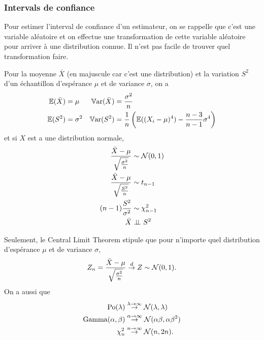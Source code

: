 \subsubsection{Intervals de confiance}
Pour estimer l'interval de confiance d'un estimateur,
on se rappelle que c'est une variable aléatoire et on
effectue une transformation de cette variable aléatoire
pour arriver à une distribution connue.
Il n'est pas facile de trouver quel transformation faire.

Pour la moyenne $\bar{X}$ (en majuscule car c'est une distribution)
et la variation $S^2$ d'un échantillon d'espérance $\mu$ et de variance $\sigma$, on a
\begin{align*}
  \mathbb{E}(\bar{X}) & = \mu & \operatorname{\mathbb{V}ar}(\bar{X}) & = \frac{\sigma^2}{n}\\
  \mathbb{E}(S^2) & = \sigma^2 & \operatorname{\mathbb{V}ar}(S^2) & = \frac{1}{n}\left(\mathbb{E}((X_i-\mu)^4)-\frac{n-3}{n-1}\sigma^4\right)
\end{align*}
et si $X$ est a une distribution normale,
\begin{align*}
  \frac{\bar{X} - \mu}{\sqrt{\frac{\sigma^2}{n}}} & \sim \mathcal{N}(0, 1)\\
  \frac{\bar{X} - \mu}{\sqrt{\frac{S^2}{n}}} & \sim t_{n-1}\\
  (n-1)\frac{S^2}{\sigma^2} & \sim \chi_{n-1}^2\\
  \bar{X} & \perp\!\!\!\perp S^2\\
\end{align*}

Seulement, le Central Limit Theorem stipule que pour n'importe quel distribution
d'espérance $\mu$ et de variance $\sigma$,
\[
  Z_n = \frac{\bar{X} - \mu}{\sqrt{\frac{\sigma^2}{n}}} \stackrel{d}{\to} Z \sim \mathcal{N}(0, 1).
\]
On a aussi que
\begin{align*}
  \operatorname{Po}(\lambda) & \stackrel{\lambda\to\infty}{\to} \mathcal{N}(\lambda,\lambda)\\
  \operatorname{Gamma}(\alpha,\beta) & \stackrel{\alpha\to\infty}{\to} \mathcal{N}(\alpha\beta,\alpha\beta^2)\\
  \chi_n^2 & \stackrel{n\to\infty}{\to} \mathcal{N}(n, 2n).
\end{align*}

